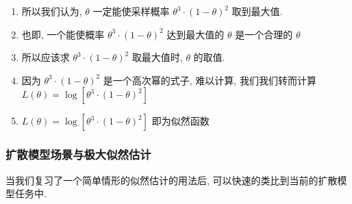 \begin{enumerate}
\begin{enumerate}
        \item 所以我们认为, $\theta$ 一定能使采样概率 $\theta^3\cdot(1-\theta)^2$ 取到最大值.
        \item 也即, 一个能使概率 $\theta^3\cdot(1-\theta)^2$ 达到最大值的 $\theta$ 是一个合理的 $\theta$
        \item 所以应该求 $\theta^3\cdot(1-\theta)^2$ 取最大值时, $\theta$ 的取值.
        \item 因为 $\theta^3\cdot(1-\theta)^2$ 是一个高次幂的式子, 难以计算, 我们我们转而计算 $L(\theta)=\log\left[ \theta^3\cdot (1-\theta)^2 \right]$ 
        \item $L(\theta)=\log\left[ \theta^3\cdot (1-\theta)^2 \right]$ 即为似然函数
    \end{enumerate}
\end{enumerate}

\subsubsection{扩散模型场景与极大似然估计}

当我们复习了一个简单情形的似然估计的用法后, 可以快速的类比到当前的扩散模型任务中.

